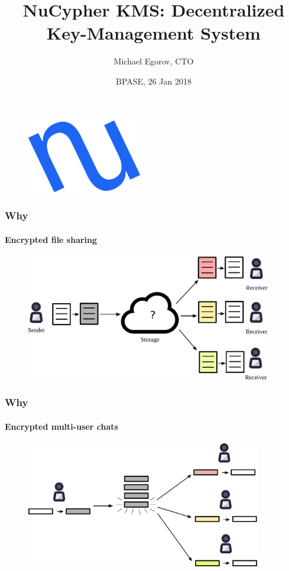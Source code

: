 \documentclass[xetex,mathsans,sans]{beamer}
\title[NuCypher KMS]{NuCypher KMS: Decentralized Key-Management System}
\author[Michael]{Michael Egorov, CTO}
\date[26 Jan 2018]{BPASE, 26 Jan 2018}
\begin{document}
    \begin{frame}
        \titlepage
        \begin{figure}
            \centering
            \includegraphics[width=5cm]{pdf/nucypher_logo.pdf}
        \end{figure}
    \end{frame}

    \begin{frame}
        \frametitle{Why}
        \framesubtitle{Encrypted file sharing}
        \begin{figure}
            \centering
            \includegraphics[height=5.5cm]{pdf/file-sharing.pdf}
        \end{figure}
    \end{frame}

    \begin{frame}
        \frametitle{Why}
        \framesubtitle{Encrypted multi-user chats}
        \begin{figure}
            \centering
            \includegraphics[height=5.5cm]{pdf/chats.pdf}
        \end{figure}
    \end{frame}
\end{document}
